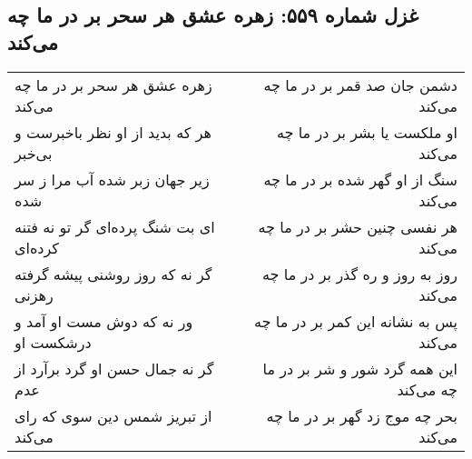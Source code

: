 \begin{center}
\section*{غزل شماره ۵۵۹: زهره عشق هر سحر بر در ما چه می‌کند}
\label{sec:0559}
\begin{longtable}{l p{0.5cm} r}
زهره عشق هر سحر بر در ما چه می‌کند
&&
دشمن جان صد قمر بر در ما چه می‌کند
\\
هر که بدید از او نظر باخبرست و بی‌خبر
&&
او ملکست یا بشر بر در ما چه می‌کند
\\
زیر جهان زبر شده آب مرا ز سر شده
&&
سنگ از او گهر شده بر در ما چه می‌کند
\\
ای بت شنگ پرده‌ای گر تو نه فتنه کرده‌ای
&&
هر نفسی چنین حشر بر در ما چه می‌کند
\\
گر نه که روز روشنی پیشه گرفته رهزنی
&&
روز به روز و ره گذر بر در ما چه می‌کند
\\
ور نه که دوش مست او آمد و درشکست او
&&
پس به نشانه این کمر بر در ما چه می‌کند
\\
گر نه جمال حسن او گرد برآرد از عدم
&&
این همه گرد شور و شر بر در ما چه می‌کند
\\
از تبریز شمس دین سوی که رای می‌کند
&&
بحر چه موج زد گهر بر در ما چه می‌کند
\\
\end{longtable}
\end{center}
